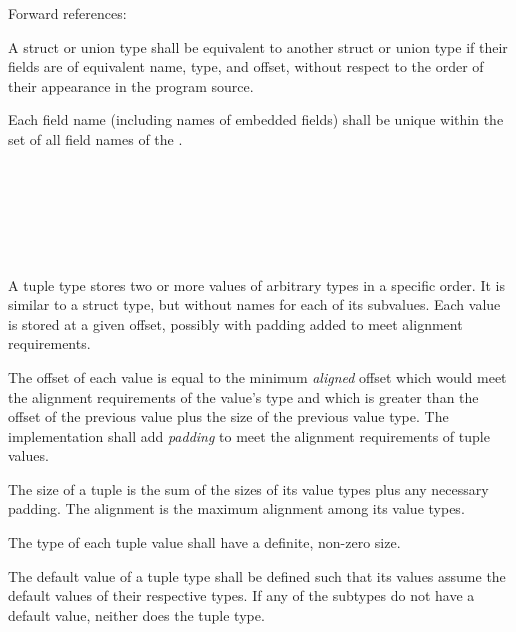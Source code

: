 Forward references: 

\specsubsubitem
A struct or union type shall be equivalent to another struct or union type if
their fields are of equivalent name, type, and offset, without respect to the
order of their appearance in the program source.


\specsubsubitem
Each field name (including names of embedded fields) shall be unique within the
set of all field names of the .


\begin{grammar}
 \\
	\terminal{(}  \terminal{)} \\

 \\
	 \terminal{,}  \optional{\terminal{,}}\\
	 \terminal{,}  \\
\end{grammar}

\specsubsubitem
A tuple type stores two or more values of arbitrary types in a specific order.
It is similar to a struct type, but without names for each of its subvalues.
Each value is stored at a given offset, possibly with padding added to meet
alignment requirements.

\specsubsubitem
The offset of each value is equal to the minimum \textit{aligned} offset which
would meet the alignment requirements of the value's type and which is greater
than the offset of the previous value plus the size of the previous value type.
The implementation shall add \textit{padding} to meet the alignment
requirements of tuple values.

\specsubsubitem
The size of a tuple is the sum of the sizes of its value types plus any necessary
padding. The alignment is the maximum alignment among its value types.

\specsubsubitem
The type of each tuple value shall have a definite, non-zero size.

\specsubsubitem
The default value of a tuple type shall be defined such that its values assume
the default values of their respective types. If any of the subtypes do not
have a default value, neither does the tuple type.


